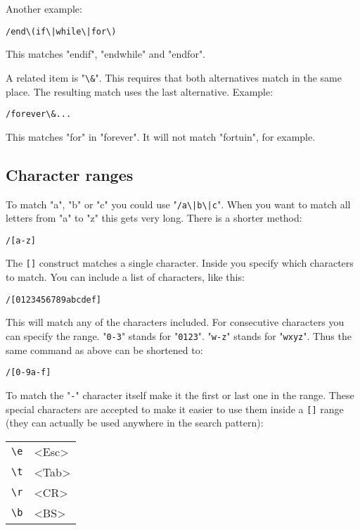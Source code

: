 Another example:

\begin{Verbatim}[samepage=true]
 /end\(if\|while\|for\)
\end{Verbatim}

This matches "endif", "endwhile" and "endfor".

A related item is "\verb!\&!".
This requires that both alternatives match in the same place.
The resulting match uses the last alternative.
Example:

\begin{Verbatim}[samepage=true]
 /forever\&...
\end{Verbatim}

This matches "for" in "forever".
It will not match "fortuin", for example.
\subsection{Character ranges}
To match "a", "b" or "c" you could use "\verb!/a\|b\|c!".
When you want to match all letters from "a" to "z" this gets very long.
There is a shorter method:

\begin{Verbatim}[samepage=true]
 /[a-z]
\end{Verbatim}

The \verb![]! construct matches a single character.
Inside you specify which characters to match.
You can include a list of characters, like this:

\begin{Verbatim}[samepage=true]
 /[0123456789abcdef]
\end{Verbatim}

This will match any of the characters included.
For consecutive characters you can specify the range.
"\verb!0-3!" stands for "\verb!0123!".
"\verb!w-z!" stands for "\verb!wxyz!".
Thus the same command as above can be shortened to:

\begin{Verbatim}[samepage=true]
 /[0-9a-f]
\end{Verbatim}

To match the "\verb!-!" character itself make it the first or last one in the range.
These special characters are accepted to make it easier to use them inside a \verb![]! range (they can actually be used anywhere in the search pattern):

\begin{center} \begin{tabular}{c l}
				\verb!\e! & <Esc> \\
				\verb!\t! & <Tab> \\
				\verb!\r! & <CR>  \\
				\verb!\b! & <BS>  \\
\end{tabular} \end{center}

